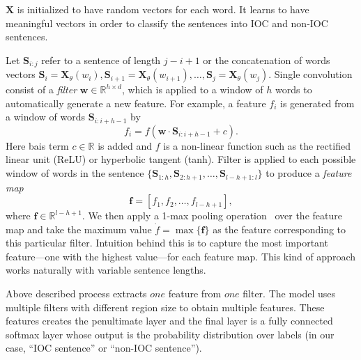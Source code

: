$\mathbf{X}$ is initialized to have random vectors for each word. It learns to have meaningful vectors in order to classify the sentences into IOC and non-IOC sentences.

Let $\mathbf{S}_{i:j}$ refer to a sentence of length $j-i+1$ or the concatenation of words vectors $\mathbf{S}_i = \mathbf{X}_\theta(w_i), \mathbf{S}_{i+1} = \mathbf{X}_\theta(w_{i+1}), \ldots, \mathbf{S}_{j}=\mathbf{X}_\theta(w_j)$.
Single convolution consist of a \emph{filter} $\mathbf{w} \in \mathbb{R}^{h\times d}$, which is applied to a window of $h$ words to automatically generate a new feature. For example, a feature $f_i$ is generated from a window of words $\mathbf{S}_{i:i+h-1}$ by
\begin{equation}
f_i = f(\mathbf{w} \cdot \mathbf{S}_{i:i+h-1} + c).
\end{equation}
Here bais term $c \in \mathbb{R}$ is added and $f$ is a non-linear function such as the rectified linear unit (ReLU) or hyperbolic tangent (tanh). Filter is applied to each possible window of words in the sentence $\{\mathbf{S}_{1:h}, \mathbf{S}_{2:h+1}, \ldots, \mathbf{S}_{l-h+1:l}\}$ to produce a \emph{feature map}
\begin{equation}
\mathbf{f} = [f_1, f_2, \ldots, f_{l-h+1}],
\end{equation}
where $\mathbf{f} \in \mathbb{R}^{l-h+1}$. We then apply a 1-max pooling operation~\cite{ranzato} over the feature map and take the maximum value $\dot{f} = \max \{\mathbf{f}\}$ as the feature corresponding to this particular filter. Intuition behind this is to capture the most important feature---one with the highest value---for each feature map. This kind of approach works naturally with variable sentence lengths. 

Above described process extracts $one$ feature from $one$ filter. The model uses multiple filters with different region size to obtain multiple features. These features creates the penultimate layer and the final layer is a fully connected softmax layer whose output is the probability distribution over labels (in our case, ``IOC sentence'' or ``non-IOC sentence'').

